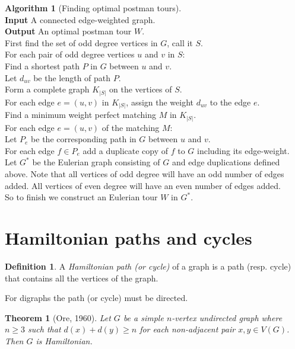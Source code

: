 \documentclass{article}
\newtheorem*{thm}{Theorem}
\theoremstyle{definition}
\newtheorem*{defn}{Definition}
\newtheorem*{alg}{Algorithm}
\begin{document}
\begin{alg}[Finding optimal postman tours]~\\
\textbf{Input} A connected edge-weighted graph. \\
\textbf{Output} An optimal postman tour $W$. \\
First find the set of odd degree vertices in $G$, call it $S$. \\
For each pair of odd degree vertices $u$ and $v$ in $S$: \\
\indent Find a shortest path $P$ in $G$ between $u$ and $v$. \\
\indent Let $d_{uv}$ be the length of path $P$. \\
Form a complete graph $K_{|S|}$ on the vertices of $S$.\\
For each edge $e = (u,v)$ in $K_{|S|}$, assign the weight $d_{uv}$ to the edge $e$.\\
Find a minimum weight perfect matching $M$ in $K_{|S|}$.\\
For each edge $e=(u,v)$ of the matching $M$: \\
\indent Let $P_e$ be the corresponding path in $G$ between $u$ and $v$. \\
\indent For each edge $f\in P_e$ add a duplicate copy of $f$ to $G$ including its edge-weight. \\
Let $G^*$ be the Eulerian graph consisting of $G$ and edge duplications defined above.
Note that all vertices of odd degree will have an odd number of edges added.
All vertices of even degree will have an even number of edges added. \\
So to finish we construct an Eulerian tour $W$ in $G^*$.
\end{alg}

\section{Hamiltonian paths and cycles}

\begin{defn}
A \emph{Hamiltonian path (or cycle)} of a graph is a path (resp. cycle) that contains all the vertices of the graph.
\end{defn}

For digraphs the path (or cycle) must be directed.

\begin{thm}[Ore, 1960]
Let $G$ be a simple $n$-vertex undirected graph where $n\ge 3$ such that $d(x) + d(y) \ge n$ for each non-adjacent pair $x,y\in V(G)$.
Then $G$ is Hamiltonian.
\end{thm}
\end{document}
